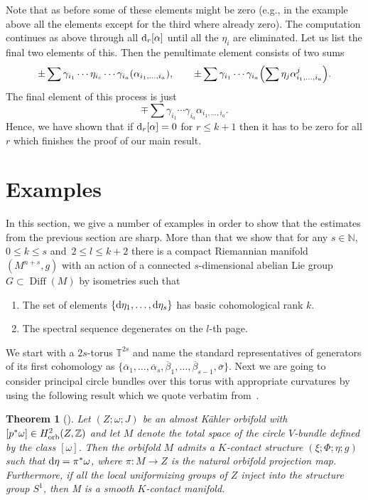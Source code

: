 \documentclass[10pt,a4paper]{amsart}
\numberwithin{equation}{section}
\newtheorem{tw}{Theorem}[section]
\theoremstyle{definition}
\begin{document}
Note that as before some of these elements might be zero (e.g., in the example above all the elements except for the third where already zero). The computation continues as above through all ${\rm d}_r[\alpha]$ until all the $\eta_i$ are eliminated. Let us list the final two elements of this. Then the penultimate element consists of two sums
\[\pm\sum \gamma_{i_1}\cdots \eta_{i_{c}}\cdots \gamma_{i_{a}}(\alpha_{i_1,\dots,i_{a}}),\qquad \pm\sum \gamma_{i_1}\cdots \gamma_{i_{a}}\Bigl(\sum \eta_{j}\alpha_{i_1,\dots,i_{a}}^{j}\Bigr).\]
The final element of this process is just
\[\mp\sum \gamma_{i_1}\cdots \gamma_{i_{a}}\alpha_{i_1,\dots,i_{a}}.\]
Hence, we have shown that if ${\rm d}_r[\alpha]=0$ for $r\leq k+1$ then it has to be zero for all $r$ which finishes the proof of our main result.

\section{Examples}%
In this section, we give a number of examples in order to show that the estimates from the previous section are sharp. More than that we show that for any $s\in\mathbb{N}$, $0\leq k\leq s$ and~$2\leq l\leq k+2$ there is a compact Riemannian manifold $(M^{n+s},g)$ with an action of a connected $s$-dimensional abelian Lie group $G\subset \operatorname{Diff}(M)$ by isometries such that
\begin{enumerate}\itemsep=0pt
\item The set of elements $\{{\rm d}\eta_1,\dots,{\rm d}\eta_s\}$ has basic cohomological rank $k$.
\item The spectral sequence degenerates on the $l$-th page.
\end{enumerate}
We start with a $2s$-torus $\mathbb{T}^{2s}$ and name the standard representatives of generators of its first cohomology as $\{\overline{\alpha}_1,\dots,\overline{\alpha}_s,\overline{\beta}_1,\dots,\overline{\beta}_{s-1},\overline{\sigma}\}$. Next we are going to consider principal circle bundles over this torus with appropriate curvatures by using the following result which we quote verbatim from~\cite{BG}.

\begin{tw}[{\cite[Theorem 7.1.6]{BG}}] Let $(Z; \omega; J)$ be an almost K\"ahler orbifold with $[p^*\omega]\in H^2_{\rm orb}(Z,\mathbb{Z})$ and let $M$ denote the total space of the circle $V$-bundle defined by the class $[\omega]$. Then the orbifold $M$ admits a $K$-contact structure $(\xi; \Phi;\eta; g)$ such that ${\rm d}\eta = \pi^*\omega$, where $\pi\colon M\to Z$ is the natural orbifold projection map. Furthermore, if all the local uniformizing groups of $Z$ inject into the structure group $S^1$, then M is a smooth $K$-contact manifold.
\end{tw}
\end{document}
